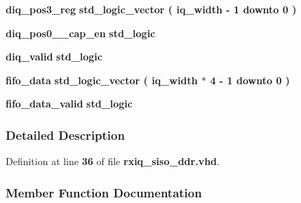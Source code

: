 \begin{DoxyCompactItemize}
\item 
{\bf diq\+\_\+pos3\+\_\+reg} {\bfseries \textcolor{comment}{std\+\_\+logic\+\_\+vector}\textcolor{vhdlchar}{ }\textcolor{vhdlchar}{(}\textcolor{vhdlchar}{ }\textcolor{vhdlchar}{ }\textcolor{vhdlchar}{ }\textcolor{vhdlchar}{ }{\bfseries {\bf iq\+\_\+width}} \textcolor{vhdlchar}{-\/}\textcolor{vhdlchar}{ } \textcolor{vhdldigit}{1} \textcolor{vhdlchar}{ }\textcolor{keywordflow}{downto}\textcolor{vhdlchar}{ }\textcolor{vhdlchar}{ } \textcolor{vhdldigit}{0} \textcolor{vhdlchar}{ }\textcolor{vhdlchar}{)}\textcolor{vhdlchar}{ }} 
\item 
{\bf diq\+\_\+pos0\+\_\+\_\+cap\+\_\+en} {\bfseries \textcolor{comment}{std\+\_\+logic}\textcolor{vhdlchar}{ }} 
\item 
{\bf diq\+\_\+valid} {\bfseries \textcolor{comment}{std\+\_\+logic}\textcolor{vhdlchar}{ }} 
\item 
{\bf fifo\+\_\+data} {\bfseries \textcolor{comment}{std\+\_\+logic\+\_\+vector}\textcolor{vhdlchar}{ }\textcolor{vhdlchar}{(}\textcolor{vhdlchar}{ }\textcolor{vhdlchar}{ }\textcolor{vhdlchar}{ }\textcolor{vhdlchar}{ }{\bfseries {\bf iq\+\_\+width}} \textcolor{vhdlchar}{$\ast$}\textcolor{vhdlchar}{ } \textcolor{vhdldigit}{4} \textcolor{vhdlchar}{-\/}\textcolor{vhdlchar}{ } \textcolor{vhdldigit}{1} \textcolor{vhdlchar}{ }\textcolor{keywordflow}{downto}\textcolor{vhdlchar}{ }\textcolor{vhdlchar}{ } \textcolor{vhdldigit}{0} \textcolor{vhdlchar}{ }\textcolor{vhdlchar}{)}\textcolor{vhdlchar}{ }} 
\item 
{\bf fifo\+\_\+data\+\_\+valid} {\bfseries \textcolor{comment}{std\+\_\+logic}\textcolor{vhdlchar}{ }} 
\end{DoxyCompactItemize}


\subsubsection{Detailed Description}


Definition at line {\bf 36} of file {\bf rxiq\+\_\+siso\+\_\+ddr.\+vhd}.



\subsubsection{Member Function Documentation}
